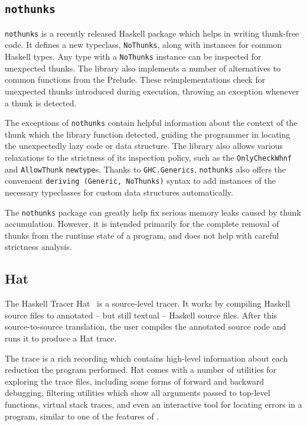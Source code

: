 \documentclass[thesis=B,english]{FITthesis}[2019/12/23]
\newcommand{\hackage}[1]{\texttt{#1}}
\newcommand{\hsType}[1]{\texttt{#1}}
\newcommand{\hsModule}[1]{\texttt{#1}}
\newcommand{\hsTC}[1]{\texttt{#1}}
\newcommand{\hsCode}[1]{\texttt{#1}}
\begin{document}
\subsection*{\hackage{nothunks}} \label{sec:nothunks}
\hackage{nothunks} is a recently released Haskell package which helps in writing
thunk-free code. It defines a new typeclass, \hsTC{NoThunks}, along with
instances for common Haskell types. Any type with a \hsTC{NoThunks} instance
can be inspected for unexpected thunks. The library also implements a number of
alternatives to common functions from the Prelude. These re\-implementations
check for unexpected thunks introduced during execution, throwing an exception
whenever a thunk is detected.

The exceptions of \hackage{nothunks} contain helpful information about the
context of the thunk which the library function detected, guiding the
programmer in locating the unexpectedly lazy code or data structure. The
library also allows various relaxations to the strictness of its inspection
policy, such as the \hsType{OnlyCheckWhnf} and \hsType{AllowThunk}
\hsCode{newtype}s. Thanks to \hsModule{GHC.Generics}\cite{ghc-generics},
\hackage{nothunks} also offers the convenient \hsCode{deriving (Generic,
NoThunks)} syntax to add instances of the necessary typeclasses for custom data
structures automatically.

The \hackage{nothunks} package can greatly help fix serious memory leaks caused
by thunk accumulation. However, it is intended primarily for the complete
removal of thunks from the runtime state of a program, and does not help with
careful strictness analysis.

\subsection*{Hat} \label{sec:hat}
The Haskell Tracer Hat~\cite{proj-hat} is a source-level tracer. It works by
compiling Haskell source files to annotated -- but still textual -- Haskell
source files. After this source-to-source translation, the user compiles the
annotated source code and runs it to produce a Hat trace.

The trace is a rich recording which contains high-level information about each
reduction the program performed. Hat comes with a number of utilities for
exploring the trace files, including some forms of forward and backward
debugging, filtering utilities which show all arguments passed to top-level
functions, virtual stack traces, and even an interactive tool for locating
errors in a program, similar to one of the features of .
\end{document}
